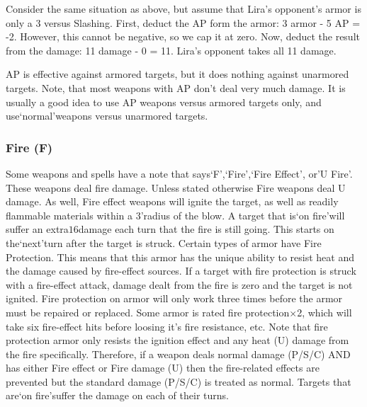 \documentclass[twoside]{book}
\begin{document}
  

  

  
    {  
    Consider the same situation as above, but assume that Lira's opponent's armor is only a 3 versus Slashing. First, deduct the AP form the armor: 3 armor - 5 AP = -2. However, this cannot be negative, so we cap it at zero. Now, deduct the result from the damage: 11 damage - 0 = 11. Lira's opponent takes all 11 damage.
    }
  
    {  
    AP is effective against armored targets, but it does nothing against unarmored targets. Note, that most weapons with AP don't deal very much damage. It is usually a good idea to use AP weapons versus armored targets only, and use`normal'weapons versus unarmored targets.
    }
  
    

\subsubsection{Fire (F)}
    
    {  
    Some weapons and spells have a note that says`F',`Fire',`Fire Effect', or'U Fire'. These weapons deal fire damage. Unless stated otherwise Fire weapons deal U damage. As well, Fire effect weapons will ignite the target, as well as readily flammable materials within a 3'radius of the blow. A target that is`on fire'will suffer an extra\ensuremath{1}\ensuremath{6}\ensuremath{}damage each turn that the fire is still going. This starts on the`next'turn after the target is struck. Certain types of armor have Fire Protection. This means that this armor has the unique ability to resist heat and the damage caused by fire-effect sources. If a target with fire protection is struck with a fire-effect attack, damage dealt from the fire is zero and the target is not ignited. Fire protection on armor will only work three times before the armor must be repaired or replaced. Some armor is rated fire protection\begin{math}\times \end{math}2, which will take six fire-effect hits before loosing it's fire resistance, etc. Note that fire protection armor only resists the ignition effect and any heat (U) damage from the fire specifically. Therefore, if a weapon deals normal damage (P/S/C) AND has either Fire effect or Fire damage (U) then the fire-related effects are prevented but the standard damage (P/S/C) is treated as normal. Targets that are`on fire'suffer the damage on each of their turns.
    }
  
\end{document}
